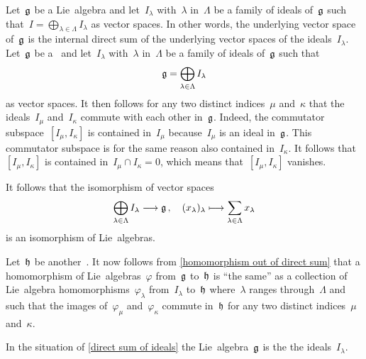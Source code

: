 \begin{example}
	\label{direct sum of ideals}
	Let~$\mathfrak{g}$ be a Lie~algebra and let~$I_\lambda$ with~$\lambda$ in~$\Lambda$ be a family of ideals of~$\mathfrak{g}$ such that~$I = \bigoplus_{\lambda \in \Lambda} I_\lambda$ as vector spaces.
	In other words, the underlying vector space of~$\mathfrak{g}$ is the internal direct sum of the underlying vector spaces of the ideals~$I_\lambda$.
	Let~$\mathfrak{g}$ be a~{\liealgebra{$\kf$}} and let~$I_\lambda$ with~$\lambda$ in~$\Lambda$ be a family of ideals of~$\mathfrak{g}$ such that
	\[
		\mathfrak{g}
		=
		\bigoplus_{\lambda \in \Lambda}
		I_\lambda
	\]
	as vector spaces.
	It then follows for any two distinct indices~$\mu$ and~$\kappa$ that the ideals~$I_\mu$ and~$I_\kappa$ commute with each other in~$\mathfrak{g}$.
	Indeed, the commutator subspace~$[I_\mu, I_\kappa]$ is contained in~$I_\mu$ because~$I_\mu$ is an ideal in~$\mathfrak{g}$.
	This commutator subspace is for the same reason also contained in~$I_\kappa$.
	It follows that~$[I_\mu, I_\kappa]$ is contained in~$I_\mu \cap I_\kappa = 0$, which means that~$[I_\mu, I_\kappa]$ vanishes.

	It follows that the isomorphism of vector spaces
	\[
		\bigoplus_{\lambda \in \Lambda}
		I_\lambda
		\to
		\glie \,,
		\quad
		(x_\lambda)_\lambda
		\mapsto
		\sum_{\lambda \in \Lambda} x_\lambda
	\]
	is an isomorphism of Lie~algebras.

	Let~$\mathfrak{h}$ be another~\liealgebra{$\kf$}.
	It now follows from \cref{homomorphism out of direct sum} that a homomorphism of Lie~algebras~$\varphi$ from~$\mathfrak{g}$ to~$\mathfrak{h}$ is \enquote{the same} as a collection of Lie~algebra homomorphisms~$\varphi_\lambda$ from~$I_\lambda$ to~$\mathfrak{h}$ where~$\lambda$ ranges through~$\Lambda$ and such that the images of~$\varphi_\mu$ and~$\varphi_\kappa$ commute in~$\mathfrak{h}$ for any two distinct indices~$\mu$ and~$\kappa$.
\end{example}


\begin{definition}
	In the situation of \cref{direct sum of ideals} the Lie~algebra~$\mathfrak{g}$ is the  the ideals~$I_\lambda$.
\end{definition}


